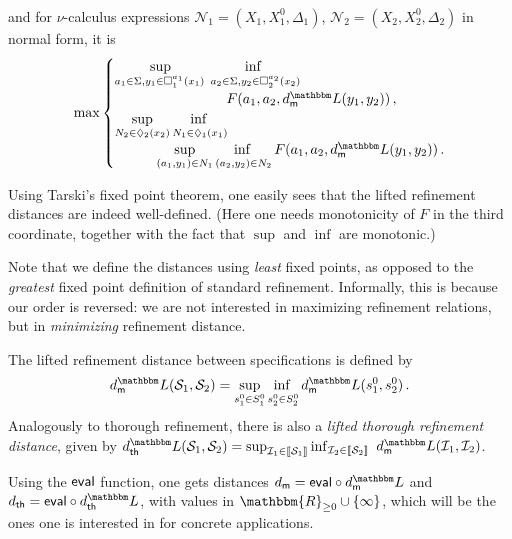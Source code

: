 \documentclass[twocolumn]{svjour3-dummy}
\newcommand*\Real{\mathbbm{R}}
\newcommand*\cI{\mathcal I}
\newcommand*\cN{\mathcal N}
\newcommand*\sem[1]{\llbracket #1\rrbracket}
\newcommand*\cS{\mathcal S}
\newcommand*\LL{\mathbbm L}
\newcommand*\Realnn{\Real_{ \ge 0}}
\newcommand*\eval{\textup{\textsf{eval}}}
\newcommand*\md{d_\textup{\textsf{m}}} \newcommand*\mdl{\smash{\md^\LL}}
\newcommand*\thd{d_\textup{\textsf{th}}} \newcommand*\thdl{\thd^\LL}
\begin{document}
\begin{definition}
\begin{multline*}
  \end{multline*}
  and for $\nu$-calculus expressions $\cN_1=( X_1, X^0_1, \Delta_1)$,
  $\cN_2=( X_2, X^0_2, \Delta_2)$ in normal form, it is
  \begin{equation*}
    \max
    \begin{cases}
      & \hspace*{-1em} \adjustlimits \sup_{ a_1\in \Sigma, y_1\in \Box^{
          a_1}_1( x_1)\,} \inf_{ \, a_2\in \Sigma, y_2\in \Box^{ a_2}_2(
        x_2)} \\ 
      & \hspace*{7em} F( a_1, a_2, \mdl( y_1, y_2))\,, \\
      &\hspace*{-1em} \adjustlimits \sup_{ N_2\in\Diamond_2( x_2)}
      \inf_{ N_1\in \Diamond_1( x_1)} \\
      &\qquad \adjustlimits \sup_{( a_1, y_1)\in
        N_1} \inf_{( a_2, y_2)\in N_2} F( a_1, a_2, \mdl( y_1, y_2))\,.
    \end{cases}
  \end{equation*}
\end{definition}

Using Tarski's fixed point theorem, one easily sees that the lifted
refinement distances are indeed well-defined.  (Here one needs
monotonicity of $F$ in the third coordinate, together with the fact that
$\sup$ and $\inf$ are monotonic.)

Note that we define the distances using \emph{least} fixed points, as
opposed to the \emph{greatest} fixed point definition of standard
refinement.  Informally, this is because our order is reversed: we are
not interested in maximizing refinement relations, but in
\emph{minimizing} refinement distance.

The lifted refinement distance between specifications is defined by
\begin{equation*}
  \mdl( \cS_1, \cS_2)= \adjustlimits \sup_{ s^0_1\in S^0_1} \inf_{
    s^0_2\in S^0_2} \mdl( s^0_1, s^0_2)\,.
\end{equation*}
Analogously to thorough refinement, there is also a \emph{lifted
  thorough refinement distance}, given by $\thdl( \cS_1, \cS_2)= \sup_{
  \cI_1\in \sem{ \cS_1}} \inf_{ \cI_2\in \sem{ \cS_2}}$ $\mdl( \cI_1,
\cI_2)$.

Using the $\eval$ function, one gets distances $\md= \eval\circ \mdl$
and $\thd= \eval\circ \thdl$, with values in $\Realnn\cup\{ \infty\}$,
which will be the ones one is interested in for concrete applications.
\end{document}
